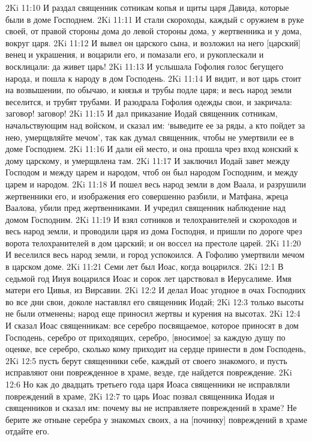 2Ki 11:10  И раздал священник сотникам копья и щиты царя Давида, которые были в доме Господнем.
2Ki 11:11  И стали скороходы, каждый с оружием в руке своей, от правой стороны дома до левой стороны дома, у жертвенника и у дома, вокруг царя.
2Ki 11:12  И вывел он царского сына, и возложил на него [царский] венец и украшения, и воцарили его, и помазали его, и рукоплескали и восклицали: да живет царь!
2Ki 11:13  И услышала Гофолия голос бегущего народа, и пошла к народу в дом Господень.
2Ki 11:14  И видит, и вот царь стоит на возвышении, по обычаю, и князья и трубы подле царя; и весь народ земли веселится, и трубят трубами. И разодрала Гофолия одежды свои, и закричала: заговор! заговор!
2Ki 11:15  И дал приказание Иодай священник сотникам, начальствующим над войском, и сказал им: `выведите ее за ряды, а кто пойдет за нею, умерщвляйте мечом', так как думал священник, чтобы не умертвили ее в доме Господнем.
2Ki 11:16  И дали ей место, и она прошла чрез вход конский к дому царскому, и умерщвлена там.
2Ki 11:17  И заключил Иодай завет между Господом и между царем и народом, чтоб он был народом Господним, и между царем и народом.
2Ki 11:18  И пошел весь народ земли в дом Ваала, и разрушили жертвенники его, и изображения его совершенно разбили, и Матфана, жреца Ваалова, убили пред жертвенниками. И учредил священник наблюдение над домом Господним.
2Ki 11:19  И взял сотников и телохранителей и скороходов и весь народ земли, и проводили царя из дома Господня, и пришли по дороге чрез ворота телохранителей в дом царский; и он воссел на престоле царей.
2Ki 11:20  И веселился весь народ земли, и город успокоился. А Гофолию умертвили мечом в царском доме.
2Ki 11:21  Семи лет был Иоас, когда воцарился.
2Ki 12:1  В седьмой год Ииуя воцарился Иоас и сорок лет царствовал в Иерусалиме. Имя матери его Цивья, из Вирсавии.
2Ki 12:2  И делал Иоас угодное в очах Господних во все дни свои, доколе наставлял его священник Иодай;
2Ki 12:3  только высоты не были отменены; народ еще приносил жертвы и курения на высотах.
2Ki 12:4  И сказал Иоас священникам: все серебро посвящаемое, которое приносят в дом Господень, серебро от приходящих, серебро, [вносимое] за каждую душу по оценке, все серебро, сколько кому приходит на сердце принести в дом Господень,
2Ki 12:5  пусть берут священники себе, каждый от своего знакомого, и пусть исправляют они поврежденное в храме, везде, где найдется повреждение.
2Ki 12:6  Но как до двадцать третьего года царя Иоаса священники не исправляли повреждений в храме,
2Ki 12:7  то царь Иоас позвал священника Иодая и священников и сказал им: почему вы не исправляете повреждений в храме? Не берите же отныне серебра у знакомых своих, а на [починку] повреждений в храме отдайте его.
